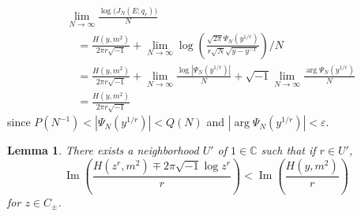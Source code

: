 \documentclass[a4paper]{amsart}
\theoremstyle{plain}
\newtheorem{lem}[thm]{Lemma}
\theoremstyle{definition}
\theoremstyle{remark}
\newcommand{\C}{\mathbb{C}}
\renewcommand{\Im}{\operatorname{Im}}
\numberwithin{equation}{section}
\begin{document}
\begin{equation*}
\begin{split}
  &\lim_{N\to\infty}\frac{\log\bigl(J_N(E;q_r)\bigr)}{N}
  \\
  &\quad=
  \frac{H(y,m^2)}{2\pi{r}\sqrt{-1}}
  +
  \lim_{N\to\infty}
  \log
  \left(\frac{\sqrt{2\pi}\Psi_N(y^{1/r})}{r\sqrt{N}\sqrt{y-y^{-1}}}\right)
  \big/N
  \\
  &\quad=
  \frac{H(y,m^2)}{2\pi{r}\sqrt{-1}}
  +
  \lim_{N\to\infty}\frac{\log\left|\Psi_N(y^{1/r})\right|}{N}
  +
  \sqrt{-1}\lim_{N\to\infty}\frac{\arg\Psi_N(y^{1/r})}{N}
  \\
  &\quad=
  \frac{H(y,m^2)}{2\pi{r}\sqrt{-1}}
\end{split}
\end{equation*}
since $P(N^{-1})<|\Psi_N(y^{1/r})|<Q(N)$ and
$|\arg\Psi_N(y^{1/r})|<\varepsilon$.
\begin{lem}\label{lem:C_-}
There exists a neighborhood $U'$ of $1\in\C$ such that if $r{\in}U'$,
\begin{equation}\label{eq:ineq}
  \Im
  \left(
    \frac{H\left(z^r,m^2\right)\mp2\pi\sqrt{-1}\log{z^r}}{r}
  \right)
  <
  \Im
  \left(
    \frac{H(y,m^2)}{r}
  \right)
\end{equation}
for $z\in{C_{\pm}}$.
\end{lem}
\end{document}
